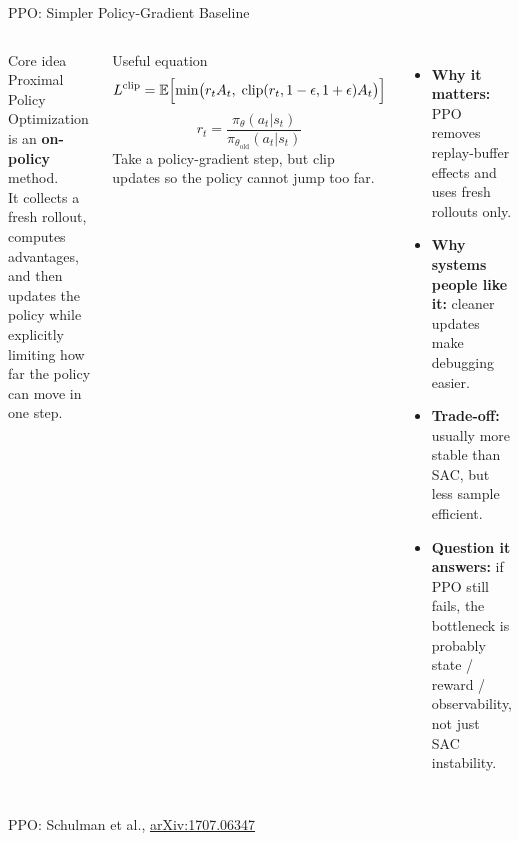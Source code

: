 \documentclass[10pt,aspectratio=169]{beamer}
\begin{document}
\begin{frame}{PPO: Simpler Policy-Gradient Baseline}
  \begin{columns}[T,onlytextwidth]
      \begin{block}{Core idea}
        \scriptsize
        Proximal Policy Optimization is an \textbf{on-policy} method.\\[0.2em]
        It collects a fresh rollout, computes advantages, and then updates the policy while explicitly limiting how far the policy can move in one step.
      \end{block}

      \begin{block}{Useful equation}
        \scriptsize
        \begin{equation*}
        L^{\mathrm{clip}}
        =
        \mathbb{E}\Bigl[
        \min\bigl(
        r_t A_t,\;
        \mathrm{clip}(r_t,1-\epsilon,1+\epsilon)A_t
        \bigr)
        \Bigr]
        \end{equation*}
        \begin{equation*}
        r_t = \frac{\pi_{\theta}(a_t|s_t)}{\pi_{\theta_{\mathrm{old}}}(a_t|s_t)}
        \end{equation*}
        \scriptsize
        Take a policy-gradient step, but clip updates so the policy cannot jump too far.
      \end{block}
      \scriptsize
      \begin{itemize}
        \item \textbf{Why it matters:} PPO removes replay-buffer effects and uses fresh rollouts only.
        \item \textbf{Why systems people like it:} cleaner updates make debugging easier.
        \item \textbf{Trade-off:} usually more stable than SAC, but less sample efficient.
        \item \textbf{Question it answers:} if PPO still fails, the bottleneck is probably state / reward / observability, not just SAC instability.
      \end{itemize}
  \end{columns}

  \vspace{0.2em}
  {\tiny PPO: Schulman et al., \href{https://arxiv.org/abs/1707.06347}{arXiv:1707.06347}}
\end{frame}
\end{document}
